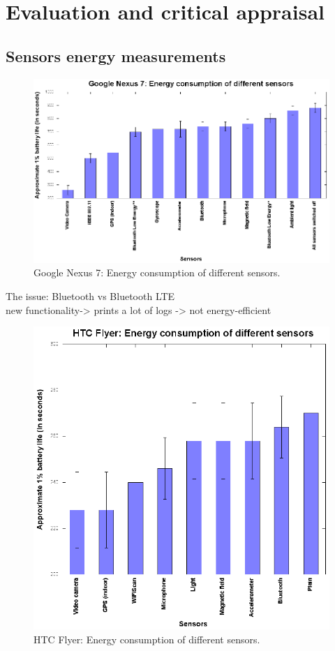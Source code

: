 \section{Evaluation and critical appraisal}
\label{s:evaluation}
\subsection{Sensors energy measurements}
\begin{figure}[H]
\centering
\includegraphics[scale=1.5]{plots/google_nexus_7.eps}
\caption{Google Nexus 7: Energy  consumption of different sensors.}
\end{figure}
The issue: Bluetooth vs Bluetooth LTE\\
	new functionality-> prints a lot of logs -> not energy-efficient\\

\begin{figure}[H]
\centering
\includegraphics[scale=1.5]{plots/htc_flyer.eps}
\caption{HTC Flyer: Energy  consumption of different sensors.}
\end{figure}


